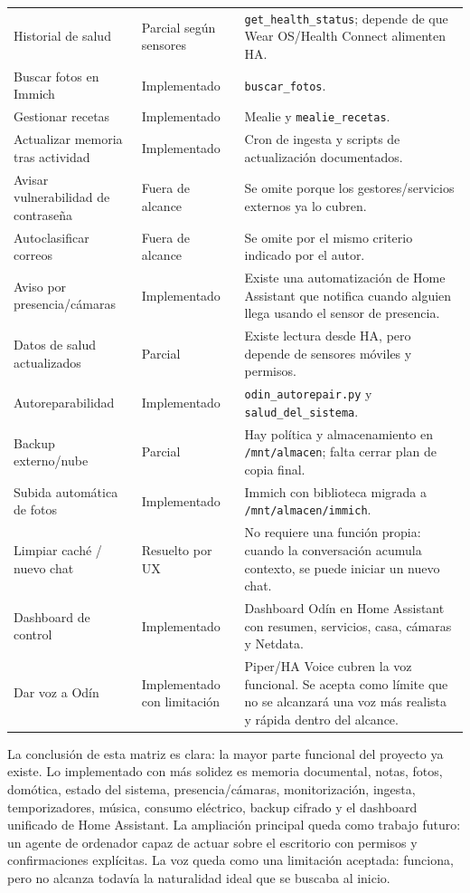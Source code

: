 \begin{longtable}{p{}p{}p{}}
  Historial de salud & Parcial según sensores & \texttt{get\_health\_status}; depende de que Wear OS/Health Connect alimenten HA. \\
  Buscar fotos en Immich & Implementado & \texttt{buscar\_fotos}. \\
  Gestionar recetas & Implementado & Mealie y \texttt{mealie\_recetas}. \\
  Actualizar memoria tras actividad & Implementado & Cron de ingesta y scripts de actualización documentados. \\
  Avisar vulnerabilidad de contraseña & Fuera de alcance & Se omite porque los gestores/servicios externos ya lo cubren. \\
  Autoclasificar correos & Fuera de alcance & Se omite por el mismo criterio indicado por el autor. \\
  Aviso por presencia/cámaras & Implementado & Existe una automatización de Home Assistant que notifica cuando alguien llega usando el sensor de presencia. \\
  Datos de salud actualizados & Parcial & Existe lectura desde HA, pero depende de sensores móviles y permisos. \\
  Autoreparabilidad & Implementado & \texttt{odin\_autorepair.py} y \texttt{salud\_del\_sistema}. \\
  Backup externo/nube & Parcial & Hay política y almacenamiento en \nolinkurl{/mnt/almacen}; falta cerrar plan de copia final. \\
  Subida automática de fotos & Implementado & Immich con biblioteca migrada a \nolinkurl{/mnt/almacen/immich}. \\
  Limpiar caché / nuevo chat & Resuelto por UX & No requiere una función propia: cuando la conversación acumula contexto, se puede iniciar un nuevo chat. \\
  Dashboard de control & Implementado & Dashboard Odín en Home Assistant con resumen, servicios, casa, cámaras y Netdata. \\
  Dar voz a Odín & Implementado con limitación & Piper/HA Voice cubren la voz funcional. Se acepta como límite que no se alcanzará una voz más realista y rápida dentro del alcance. \\
\end{longtable}
\endgroup

La conclusión de esta matriz es clara: la mayor parte funcional del proyecto ya existe. Lo implementado con más solidez es memoria documental, notas, fotos, domótica, estado del sistema, presencia/cámaras, monitorización, ingesta, temporizadores, música, consumo eléctrico, backup cifrado y el dashboard unificado de Home Assistant. La ampliación principal queda como trabajo futuro: un agente de ordenador capaz de actuar sobre el escritorio con permisos y confirmaciones explícitas. La voz queda como una limitación aceptada: funciona, pero no alcanza todavía la naturalidad ideal que se buscaba al inicio.

